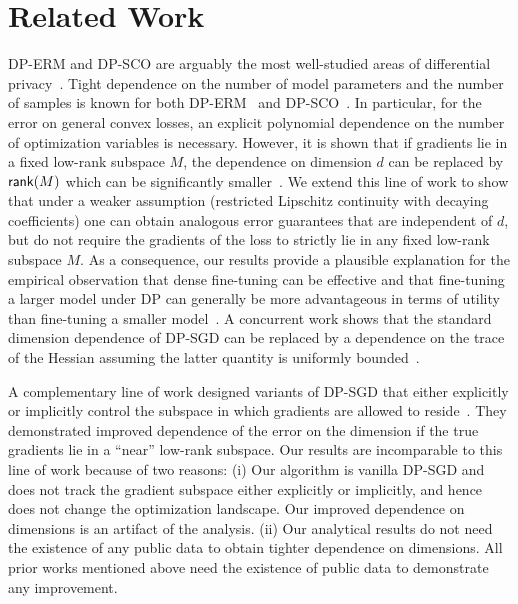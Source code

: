 \section{Related Work}
DP-ERM and DP-SCO are arguably the most well-studied areas of differential privacy~\cite{chaudhuri2011differentially,kifer2012private,bassily2014private,song2013stochastic,wang17amd,fts17,bassily2019private,mcmahan2017learning,zzmw17,WLKCJN17,FKT20,iyengar2019towards,BFGT20,song2020characterizing,ll21,afkt21,bgn21,gtu22,gll22}. Tight dependence on the number of model parameters and the number of samples is known for both DP-ERM~\cite{bassily2014private} and DP-SCO~\cite{bassily2019private}. 
In particular, for the error on general convex losses, an explicit polynomial dependence on the number of optimization variables is necessary.
However, it is shown that if gradients lie in a fixed low-rank subspace $M$, the dependence on dimension $d$ can be replaced by ${\sf rank}(M)$ which can be significantly smaller~\cite{jain2014near,song2020characterizing}. 
We extend this line of work to show that under a weaker assumption (restricted Lipschitz continuity with decaying coefficients) one can obtain analogous error guarantees that are independent of $d$, but do not require the gradients of the loss to strictly lie in any fixed low-rank subspace $M$. 
As a consequence, our results provide a plausible explanation for the empirical observation that dense fine-tuning can be effective and that fine-tuning a larger model under DP can generally be more advantageous in terms of utility than fine-tuning a smaller model~\cite{li2021large,yu2021differentially}. 
A concurrent work shows that the standard dimension dependence of DP-SGD can be replaced by a dependence on the trace of the Hessian assuming the latter quantity is uniformly bounded~\cite{ma2022dimension}.

A complementary line of work designed variants of DP-SGD that either explicitly or implicitly control the subspace in which gradients are allowed to reside~\cite{PDA-DPMD,liu2021leveraging,asi2021private,KRRT21,YZCL21}. 
They demonstrated improved dependence of the error on the dimension if the true gradients lie in a ``near'' low-rank subspace. 
Our results are incomparable to this line of work because of two reasons: (i) Our algorithm is vanilla DP-SGD and does not track the gradient subspace either explicitly or implicitly, and hence does not change the optimization landscape. 
Our improved dependence on dimensions is an artifact of the analysis. 
(ii) Our analytical results do not need the existence of any public data to obtain tighter dependence on dimensions. All prior works mentioned above need the existence of public data to demonstrate any improvement.

